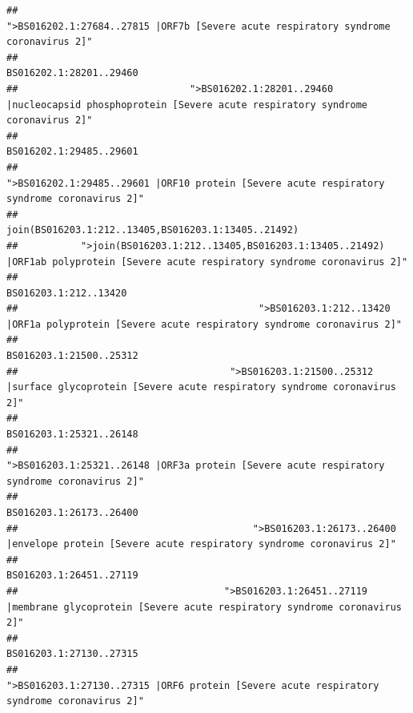 \documentclass[
]{article}
\begin{document}
\begin{verbatim}
##                                                    ">BS016202.1:27684..27815 |ORF7b [Severe acute respiratory syndrome coronavirus 2]" 
##                                                                                                                BS016202.1:28201..29460 
##                              ">BS016202.1:28201..29460 |nucleocapsid phosphoprotein [Severe acute respiratory syndrome coronavirus 2]" 
##                                                                                                                BS016202.1:29485..29601 
##                                            ">BS016202.1:29485..29601 |ORF10 protein [Severe acute respiratory syndrome coronavirus 2]" 
##                                                                                    join(BS016203.1:212..13405,BS016203.1:13405..21492) 
##           ">join(BS016203.1:212..13405,BS016203.1:13405..21492) |ORF1ab polyprotein [Severe acute respiratory syndrome coronavirus 2]" 
##                                                                                                                  BS016203.1:212..13420 
##                                          ">BS016203.1:212..13420 |ORF1a polyprotein [Severe acute respiratory syndrome coronavirus 2]" 
##                                                                                                                BS016203.1:21500..25312 
##                                     ">BS016203.1:21500..25312 |surface glycoprotein [Severe acute respiratory syndrome coronavirus 2]" 
##                                                                                                                BS016203.1:25321..26148 
##                                            ">BS016203.1:25321..26148 |ORF3a protein [Severe acute respiratory syndrome coronavirus 2]" 
##                                                                                                                BS016203.1:26173..26400 
##                                         ">BS016203.1:26173..26400 |envelope protein [Severe acute respiratory syndrome coronavirus 2]" 
##                                                                                                                BS016203.1:26451..27119 
##                                    ">BS016203.1:26451..27119 |membrane glycoprotein [Severe acute respiratory syndrome coronavirus 2]" 
##                                                                                                                BS016203.1:27130..27315 
##                                             ">BS016203.1:27130..27315 |ORF6 protein [Severe acute respiratory syndrome coronavirus 2]" 

\end{verbatim}
\end{document}
